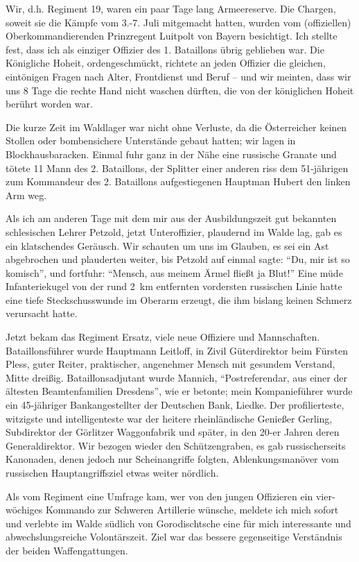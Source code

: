 \documentclass[a5paper,pagesize,10pt,twoside=true]{scrbook}
\begin{document}
Wir, d.h. Regiment 19, waren ein paar Tage lang Armeereserve. Die Chargen, soweit sie die Kämpfe vom 3.-7. Juli mitgemacht hatten, wurden vom (offiziellen) Oberkommandierenden Prinzregent Luitpolt von Bayern besichtigt. Ich stellte fest, dass ich als einziger Offizier des 1. Bataillons übrig geblieben war. Die Königliche Hoheit, ordengeschmückt, richtete an jeden Offizier die gleichen, eintönigen Fragen nach Alter, Frontdienst und Beruf -- und wir meinten, dass wir uns 8 Tage die rechte Hand nicht waschen dürften, die von der königlichen Hoheit berührt worden war.

Die kurze Zeit im Waldlager war nicht ohne Verluste, da die Österreicher keinen Stollen oder bombensichere Unterstände gebaut hatten; wir lagen in Blockhausbaracken. Einmal fuhr ganz in der Nähe eine russische Granate und tötete 11 Mann des 2. Bataillons, der Splitter einer anderen riss dem 51-jährigen zum Kommandeur des 2. Bataillons aufgestiegenen Hauptman Hubert den linken Arm weg.

Als ich am anderen Tage mit dem mir aus der Ausbildungszeit gut bekannten schlesischen Lehrer Petzold, jetzt Unteroffizier, plaudernd im Walde lag, gab es ein klatschendes Geräusch. Wir schauten um uns im Glauben, es sei ein Ast abgebrochen und plauderten weiter, bis Petzold auf einmal sagte: \enquote{Du, mir ist so komisch}, und fortfuhr: \enquote{Mensch, aus meinem Ärmel fließt ja Blut!} Eine müde Infanteriekugel von der rund 2~km entfernten vordersten russischen Linie hatte eine tiefe Steckschusswunde im Oberarm erzeugt, die ihm bislang keinen Schmerz verursacht hatte.

Jetzt bekam das Regiment Ersatz, viele neue Offiziere und Mannschaften. Bataillonsführer wurde Hauptmann Leitloff, in Zivil Güterdirektor beim Fürsten Pless, guter Reiter, praktischer, angenehmer Mensch mit gesundem Verstand, Mitte dreißig. Bataillonsadjutant wurde Mannich, \enquote{Postreferendar, aus einer der ältesten Beamtenfamilien Dresdens}, wie er betonte; mein Kompanieführer wurde ein 45-jähriger Bankangestellter der Deutschen Bank, Liedke. Der profilierteste, witzigste und intelligenteste war der heitere rheinländische Genießer Gerling, Subdirektor der Görlitzer Waggonfabrik und später, in den 20-er Jahren deren Generaldirektor. Wir bezogen wieder den Schützengraben, es gab russischerseits Kanonaden, denen jedoch nur Scheinangriffe folgten, Ablenkungsmanöver vom russischen Hauptangriffsziel etwas weiter nördlich.

Als vom Regiment eine Umfrage kam, wer von den jungen Offizieren ein vier-wöchiges Kommando zur Schweren Artillerie wünsche, meldete ich mich sofort und verlebte im Walde südlich von Gorodischtsche eine für mich interessante und abwechslungsreiche Volontärszeit. Ziel war das bessere gegenseitige Verständnis der beiden Waffengattungen.
\end{document}
